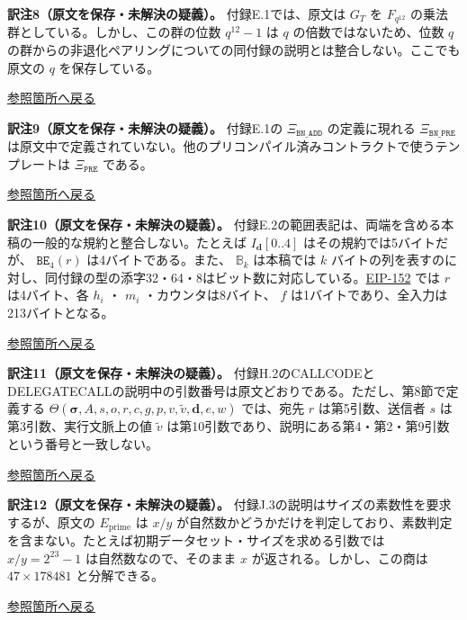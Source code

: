 \documentclass[
]{ltjsarticle}
\begin{document}
\leavevmode{}%
\textbf{訳注8（原文を保存・未解決の疑義）。} 付録E.1では、原文は \(G_T\)
を \(F_{q^{12}}\) の乗法群としている。しかし、この群の位数 \(q^{12}-1\)
は \(q\) の倍数ではないため、位数 \(q\)
の群からの非退化ペアリングについての同付録の説明とは整合しない。ここでも原文の
\(q\) を保存している。

\protect\hyperlink{tnref-8}{参照箇所へ戻る}

\leavevmode{}%
\textbf{訳注9（原文を保存・未解決の疑義）。} 付録E.1の
\(\Xi_{\mathtt{BN\_ADD}}\) の定義に現れる \(\Xi_{\mathtt{BN\_PRE}}\)
は原文中で定義されていない。他のプリコンパイル済みコントラクトで使うテンプレートは
\(\Xi_{\mathtt{PRE}}\) である。

\protect\hyperlink{tnref-9}{参照箇所へ戻る}

\leavevmode{}%
\textbf{訳注10（原文を保存・未解決の疑義）。}
付録E.2の範囲表記は、両端を含める本稿の一般的な規約と整合しない。たとえば
\(I_{\mathbf{d}}[0..4]\) はその規約では5バイトだが、
\(\mathtt{BE}_4(r)\) は4バイトである。また、 \(\mathbb{B}_k\) は本稿では
\(k\)
バイトの列を表すのに対し、同付録の型の添字32・64・8はビット数に対応している。\href{https://eips.ethereum.org/EIPS/eip-152\#specification}{EIP-152}
では \(r\) は4バイト、各 \(h_i\) ・ \(m_i\) ・カウンタは8バイト、 \(f\)
は1バイトであり、全入力は213バイトとなる。

\protect\hyperlink{tnref-10}{参照箇所へ戻る}

\leavevmode{}%
\textbf{訳注11（原文を保存・未解決の疑義）。}
付録H.2のCALLCODEとDELEGATECALLの説明中の引数番号は原文どおりである。ただし、第8節で定義する
\(\Theta(\boldsymbol{\sigma}, A, s, o, r, c, g, p, v, \tilde v, \mathbf{d}, e, w)\)
では、宛先 \(r\) は第5引数、送信者 \(s\) は第3引数、実行文脈上の値
\(\tilde v\)
は第10引数であり、説明にある第4・第2・第9引数という番号と一致しない。

\protect\hyperlink{tnref-11}{参照箇所へ戻る}

\leavevmode{}%
\textbf{訳注12（原文を保存・未解決の疑義）。}
付録J.3の説明はサイズの素数性を要求するが、原文の \(E_{\mathrm{prime}}\)
は \(x/y\)
が自然数かどうかだけを判定しており、素数判定を含まない。たとえば初期データセット・サイズを求める引数では
\(x/y=2^{23}-1\) は自然数なので、そのまま \(x\)
が返される。しかし、この商は \(47\times178481\) と分解できる。

\protect\hyperlink{tnref-12}{参照箇所へ戻る}
\end{document}
